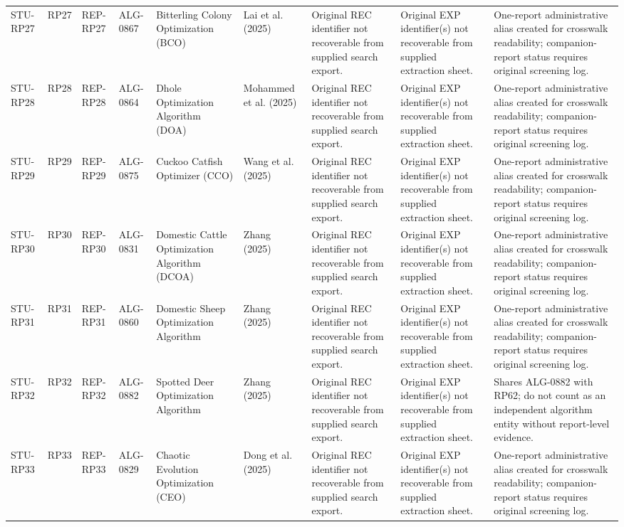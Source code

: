 \documentclass[9pt]{article}
\begin{document}
\begin{landscape}
\begin{longtable}{P{1.5cm}P{1.0cm}P{1.8cm}P{1.8cm}P{5.2cm}P{4.3cm}P{3.4cm}P{3.3cm}P{3.0cm}}
STU-RP27 & RP27 & REP-RP27 & ALG-0867 & Bitterling Colony Optimization (BCO) & Lai et al. (2025) & Original REC identifier not recoverable from supplied search export. & Original EXP identifier(s) not recoverable from supplied extraction sheet. & One-report administrative alias created for crosswalk readability; companion-report status requires original screening log. \\
STU-RP28 & RP28 & REP-RP28 & ALG-0864 & Dhole Optimization Algorithm (DOA) & Mohammed et al. (2025) & Original REC identifier not recoverable from supplied search export. & Original EXP identifier(s) not recoverable from supplied extraction sheet. & One-report administrative alias created for crosswalk readability; companion-report status requires original screening log. \\
STU-RP29 & RP29 & REP-RP29 & ALG-0875 & Cuckoo Catfish Optimizer (CCO) & Wang et al. (2025) & Original REC identifier not recoverable from supplied search export. & Original EXP identifier(s) not recoverable from supplied extraction sheet. & One-report administrative alias created for crosswalk readability; companion-report status requires original screening log. \\
STU-RP30 & RP30 & REP-RP30 & ALG-0831 & Domestic Cattle Optimization Algorithm (DCOA) & Zhang (2025) & Original REC identifier not recoverable from supplied search export. & Original EXP identifier(s) not recoverable from supplied extraction sheet. & One-report administrative alias created for crosswalk readability; companion-report status requires original screening log. \\
STU-RP31 & RP31 & REP-RP31 & ALG-0860 & Domestic Sheep Optimization Algorithm & Zhang (2025) & Original REC identifier not recoverable from supplied search export. & Original EXP identifier(s) not recoverable from supplied extraction sheet. & One-report administrative alias created for crosswalk readability; companion-report status requires original screening log. \\
STU-RP32 & RP32 & REP-RP32 & ALG-0882 & Spotted Deer Optimization Algorithm & Zhang (2025) & Original REC identifier not recoverable from supplied search export. & Original EXP identifier(s) not recoverable from supplied extraction sheet. & Shares ALG-0882 with RP62; do not count as an independent algorithm entity without report-level evidence. \\
STU-RP33 & RP33 & REP-RP33 & ALG-0829 & Chaotic Evolution Optimization (CEO) & Dong et al. (2025) & Original REC identifier not recoverable from supplied search export. & Original EXP identifier(s) not recoverable from supplied extraction sheet. & One-report administrative alias created for crosswalk readability; companion-report status requires original screening log. \\

\end{longtable}
\end{landscape}
\end{document}
